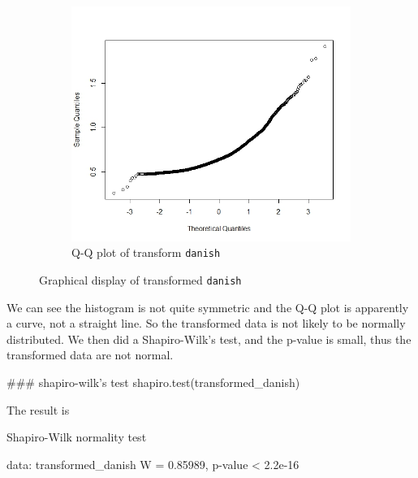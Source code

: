 \documentclass{article}
\begin{document}
\begin{enumerate}[leftmargin = 0 em, label = \arabic*., font = \bfseries]
\begin{enumerate}
\begin{enumerate}
\begin{figure}[!htb]
\begin{subfigure}[b]{0.4\textwidth}
 	\includegraphics[width = \textwidth]{qq.jpeg}
 	\caption{Q-Q plot of transform \texttt{danish}}
 	\label{qq}
 	\end{subfigure}
 	\caption{Graphical display of transformed \texttt{danish}}
 \end{figure} 

 We can see the histogram is not quite symmetric and the Q-Q plot is apparently a curve, not a straight line. So the transformed data is not likely to be normally distributed.
\newpage
We then did a Shapiro-Wilk's test, and the p-value is small, thus the transformed data are not normal.
\begin{rcode}
### shapiro-wilk's test
shapiro.test(transformed_danish)
\end{rcode}
The result is
\begin{rcode}
	Shapiro-Wilk normality test

data:  transformed_danish
W = 0.85989, p-value < 2.2e-16
\end{rcode}
	\end{enumerate}

	\end{enumerate}


	
	
		\end{enumerate}










	
	
	
	
\end{document}
